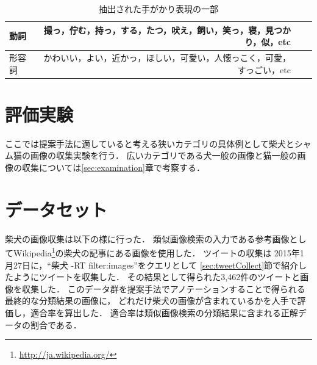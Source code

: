 \documentclass{deimj}
\begin{document}

\begin{table}[bt]
\begin{center}
\caption{抽出された手がかり表現の一部}
\label{tab:predicate}
\begin{tabular}{|l|r|r|r|}\hline
動詞& 撮っ，佇む，持っ，する，たつ，吠え，飼い，笑っ，寝，見つかり，似，etc \\ \hline
形容詞& かわいい，よい，近かっ，ほしい，可愛い，人懐っこく，可愛，すっごい，etc \\ \hline
\end{tabular}
\end{center}
\end{table}



\section{評価実験}
\label{sec:experiment}

ここでは提案手法に適していると考える狭いカテゴリの具体例として柴犬とシャム猫の画像の収集実験を行う．
広いカテゴリである犬一般の画像と猫一般の画像の収集については\ref{sec:examination}章で考察する．

\section{データセット}


柴犬の画像収集は以下の様に行った．
類似画像検索の入力である参考画像としてWikipedia\footnote{\url{http://ja.wikipedia.org/}}の柴犬の記事にある画像を使用した．
ツイートの収集は
2015年1月27日に，“柴犬 -RT filter:images”をクエリとして
\ref{sec:tweetCollect}節で紹介したようにツイートを収集した．
その結果として得られた3,462件のツイートと画像を収集した．
このデータ群を提案手法でアノテーションすることで得られる最終的な分類結果の画像に，
どれだけ柴犬の画像が含まれているかを人手で評価し，適合率を算出した．
適合率は類似画像検索の分類結果に含まれる正解データの割合である．
\end{document}
